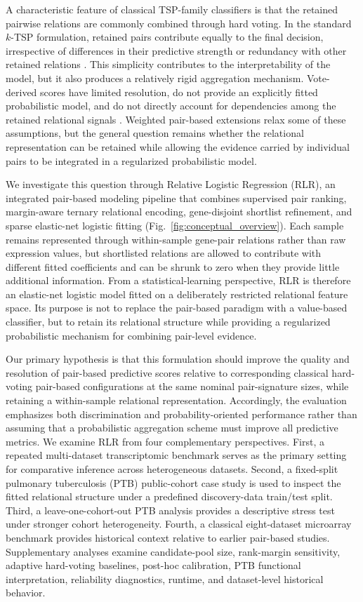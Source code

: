 \documentclass[journal]{IEEEtran}
\begin{document}
A characteristic feature of classical TSP-family classifiers is that the retained pairwise relations are commonly combined through hard voting. In the standard $k$-TSP formulation, retained pairs contribute equally to the final decision, irrespective of differences in their predictive strength or redundancy with other retained relations \cite{Tan2005}. This simplicity contributes to the interpretability of the model, but it also produces a relatively rigid aggregation mechanism. Vote-derived scores have limited resolution, do not provide an explicitly fitted probabilistic model, and do not directly account for dependencies among the retained relational signals \cite{Magis2012,Moody2020}. Weighted pair-based extensions relax some of these assumptions, but the general question remains whether the relational representation can be retained while allowing the evidence carried by individual pairs to be integrated in a regularized probabilistic model.

We investigate this question through Relative Logistic Regression (RLR), an integrated pair-based modeling pipeline that combines supervised pair ranking, margin-aware ternary relational encoding, gene-disjoint shortlist refinement, and sparse elastic-net logistic fitting (Fig.~\ref{fig:conceptual_overview}). Each sample remains represented through within-sample gene-pair relations rather than raw expression values, but shortlisted relations are allowed to contribute with different fitted coefficients and can be shrunk to zero when they provide little additional information. From a statistical-learning perspective, RLR is therefore an elastic-net logistic model fitted on a deliberately restricted relational feature space. Its purpose is not to replace the pair-based paradigm with a value-based classifier, but to retain its relational structure while providing a regularized probabilistic mechanism for combining pair-level evidence.

Our primary hypothesis is that this formulation should improve the quality and resolution of pair-based predictive scores relative to corresponding classical hard-voting pair-based configurations at the same nominal pair-signature sizes, while retaining a within-sample relational representation. Accordingly, the evaluation emphasizes both discrimination and probability-oriented performance rather than assuming that a probabilistic aggregation scheme must improve all predictive metrics. We examine RLR from four complementary perspectives. First, a repeated multi-dataset transcriptomic benchmark serves as the primary setting for comparative inference across heterogeneous datasets. Second, a fixed-split pulmonary tuberculosis (PTB) public-cohort case study is used to inspect the fitted relational structure under a predefined discovery-data train/test split. Third, a leave-one-cohort-out PTB analysis provides a descriptive stress test under stronger cohort heterogeneity. Fourth, a classical eight-dataset microarray benchmark provides historical context relative to earlier pair-based studies. Supplementary analyses examine candidate-pool size, rank-margin sensitivity, adaptive hard-voting baselines, post-hoc calibration, PTB functional interpretation, reliability diagnostics, runtime, and dataset-level historical behavior.
\end{document}

